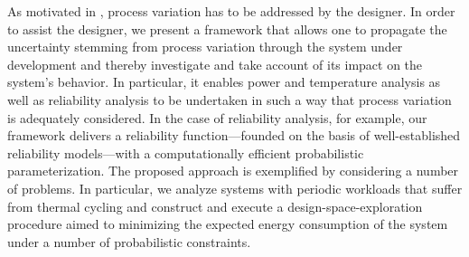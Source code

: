As motivated in , process variation has to be addressed
by the designer. In order to assist the designer, we present a framework that
allows one to propagate the uncertainty stemming from process variation through
the system under development and thereby investigate and take account of its
impact on the system's behavior. In particular, it enables power and temperature
analysis as well as reliability analysis to be undertaken in such a way that
process variation is adequately considered. In the case of reliability analysis,
for example, our framework delivers a reliability function---founded on the
basis of well-established reliability models---with a computationally efficient
probabilistic parameterization. The proposed approach is exemplified by
considering a number of problems. In particular, we analyze systems with
periodic workloads that suffer from thermal cycling and construct and execute a
design-space-exploration procedure aimed to minimizing the expected energy
consumption of the system under a number of probabilistic constraints.
